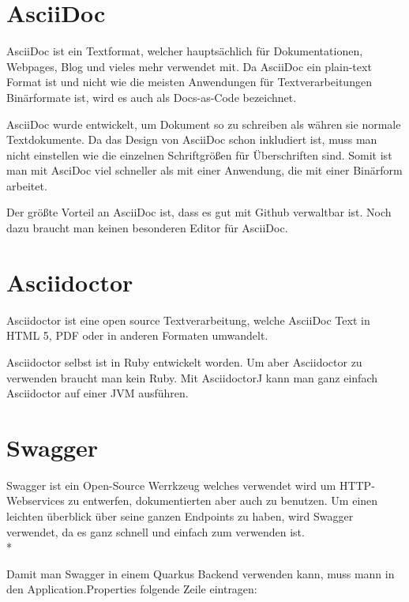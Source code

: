 




\pagebreak



\section{AsciiDoc}
\author{David Ignjatovic}

AsciiDoc ist ein Textformat, welcher hauptsächlich für Dokumentationen, Webpages, Blog und vieles mehr verwendet mit.
Da AsciiDoc ein plain-text Format ist und nicht wie die meisten Anwendungen für Textverarbeitungen Binärformate ist, wird es auch als Docs-as-Code bezeichnet.

AsciiDoc wurde entwickelt, um Dokument so zu schreiben als währen sie normale Textdokumente. Da das Design von AsciiDoc schon inkludiert ist,
muss man nicht einstellen wie die einzelnen Schriftgrößen für Überschriften sind. Somit ist man mit AsciDoc viel schneller als mit einer Anwendung,
die mit einer Binärform arbeitet.

Der größte Vorteil an AsciiDoc ist, dass es gut mit Github verwaltbar ist. Noch dazu braucht man keinen besonderen Editor für AsciiDoc. 

\section{Asciidoctor}
\author{David Ignjatovic}

Asciidoctor ist eine open source Textverarbeitung, welche AsciiDoc Text in HTML 5, PDF oder in anderen Formaten umwandelt.

Asciidoctor selbst ist in Ruby entwickelt worden. Um aber Asciidoctor zu verwenden braucht man kein Ruby. Mit AsciidoctorJ
kann man ganz einfach Asciidoctor auf einer JVM ausführen.

\pagebreak

\section{Swagger}
\author{David Ignjatovic} 

Swagger ist ein Open-Source Werrkzeug welches verwendet wird um HTTP-Webservices zu entwerfen, dokumentierten aber auch zu benutzen. Um einen leichten überblick über seine 
ganzen Endpoints zu haben, wird Swagger verwendet, da es ganz schnell und einfach zum verwenden ist. \\*

Damit man Swagger in einem Quarkus Backend verwenden kann, muss mann in den Application.Properties folgende Zeile eintragen:

